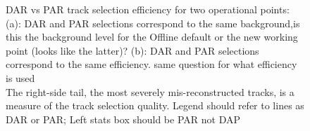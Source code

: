 \begin{figure}
\hspace{-0.6in}
\caption{
  \label{fig:mumem_dar_vs_par_ann}
  DAR vs PAR track selection efficiency for two operational points: 
  (a): DAR and PAR selections correspond to the same background,{\blue is this the background level for the Offline default or the new working point (looks like the latter)?}
  (b): DAR and PAR selections correspond
  to the same efficiency. {\blue same question for what efficiency is used}  \\
  The right-side tail,  {\blue the most severely mis-reconstructed} tracks, is a measure of
  the track selection quality{\blue .} {\blue Legend should refer to lines as DAR or PAR; Left stats box should be PAR not DAP}
}
\end{figure}

